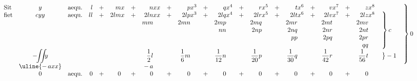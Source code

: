 $\begin{array}{lccrcrcrcrcrcrcrcrcrll}
\text{Sit} & y & \text{aequ.} & l & + & mx & + & nxx & +& px^3 & + & qx^4 & + & rx^5 & + & tx^6 & + & vx^7 & + & zx^8 & &
\parbox[c][12pt][t]{30pt}{$\left. \vphantom{\begin{array}{l} 0\\0\\0\\0\\0\\0\\0\\0\end{array}}\right \} 0$}%
\\ 
\text{fiet} & cyy & \text{aequ.} & ll & + & 2lmx & + & 2lnxx & + & 2lpx^3 & + & 2lqx^4 & + & 2lrx^5 & + & 2ltx^6 & + & 2lvx^7 & + & 2lzx^8 & & \\
 & & & & & & & mm\hphantom{xx} & & 2mn\hphantom{x^3} & & 2mp\hphantom{x^4} & & 2mq\hphantom{x^5} & & 2mr\hphantom{x^6} & & 2mt\hphantom{x^7} & & 2mv\hphantom{x^8} & & \\
 & & & & & & & & & & & nn\hphantom{x^4} & & 2np\hphantom{x^5} & & 2nq\hphantom{x^6} & & 2nr\hphantom{x^7} & & 2nt\hphantom{x^8} &
\parbox[c][0pt][c]{20pt}{$\left. \vphantom{\begin{array}{l} 0\\0\\0\\0\\0\end{array}}\right \} c$}& \\%
 & & & & & & & & & & & & & & & pp\hphantom{x^6} & & 2pq\hphantom{x^7} & & 2pr\hphantom{x^8} & & \\
 & & & & & & & & & & & & & & & & & & & qq\hphantom{x^8} & & \\
 & -\!\!\displaystyle\iint\!\!\!y & & & & & & \dfrac{1}{2}l\phantom{xx} & & \dfrac{1}{6} m\phantom{x^3} & & \dfrac{1}{12} n\phantom{x^4} & & \dfrac{1}{20} p\phantom{x^5} & & \dfrac{1}{30}q\phantom{x^6} & & \dfrac{1}{42} r\phantom{x^7} & & \dfrac{1}{56} t\phantom{x^8} &
\left. \vphantom{\begin{array}{l} 0\end{array}}\right \} -1 & \\%
 & \uline{-\,axx} & & & & & & -\,a\phantom{xx} & & & & & & & & & & & & & \\	
 & 0 & \text{aequ.} & 0 & + & 0\hphantom{x} & + & 0\hphantom{xx} & + & 0\hphantom{x^3} & + & 0\hphantom{x^4} & + & 0\hphantom{x^5} & + & 0\hphantom{x^6} & + & 0\hphantom{x^7} & + & 0\hphantom{x^8} & & 
\end{array}$%
